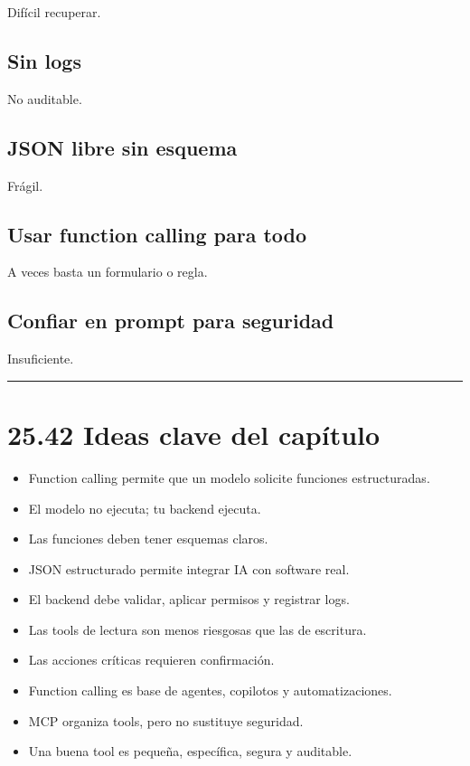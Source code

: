 Difícil recuperar.

\subsection{Sin logs}\label{sin-logs-4}

No auditable.

\subsection{JSON libre sin esquema}\label{json-libre-sin-esquema}

Frágil.

\subsection{Usar function calling para
todo}\label{usar-function-calling-para-todo}

A veces basta un formulario o regla.

\subsection{Confiar en prompt para
seguridad}\label{confiar-en-prompt-para-seguridad}

Insuficiente.

\begin{center}\rule{0.5\linewidth}{0.5pt}\end{center}

\section{25.42 Ideas clave del
capítulo}\label{ideas-clave-del-capuxedtulo-24}

\begin{itemize}
\tightlist
\item
  Function calling permite que un modelo solicite funciones
  estructuradas.
\item
  El modelo no ejecuta; tu backend ejecuta.
\item
  Las funciones deben tener esquemas claros.
\item
  JSON estructurado permite integrar IA con software real.
\item
  El backend debe validar, aplicar permisos y registrar logs.
\item
  Las tools de lectura son menos riesgosas que las de escritura.
\item
  Las acciones críticas requieren confirmación.
\item
  Function calling es base de agentes, copilotos y automatizaciones.
\item
  MCP organiza tools, pero no sustituye seguridad.
\item
  Una buena tool es pequeña, específica, segura y auditable.
\end{itemize}

